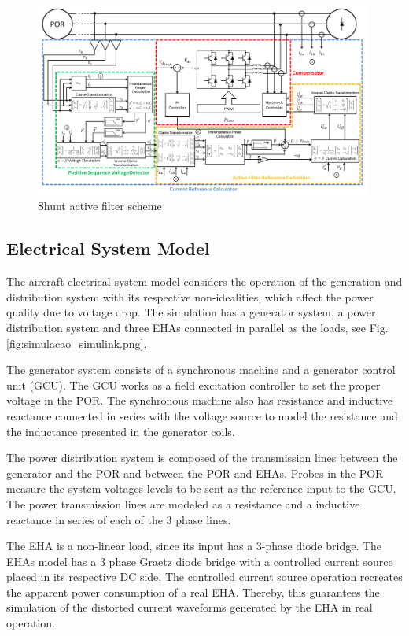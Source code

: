 \begin{figure}[!tb] %
	\centering
	\includegraphics[width=0.99\textwidth]{Figures/filtro_blocos_1.png}
	\caption{Shunt active filter scheme}
	\label{fig:filtro_blocos_1.png}
\end{figure}

\subsection{Electrical System Model}

The aircraft electrical system model considers the operation of the generation and distribution system with its respective non-idealities, which affect the power quality due to voltage drop. The simulation has a generator system, a power distribution system and three EHAs connected in parallel as the loads, see Fig. \ref{fig:simulacao_simulink.png}.

The generator system consists of a synchronous machine and a generator control unit (GCU). The GCU works as a field excitation controller to set the proper voltage in the POR. The synchronous machine also has resistance and inductive reactance connected in series with the voltage source to model the resistance and the inductance presented in the generator coils.

The power distribution system is composed of the transmission lines between the generator and the POR and between the POR and EHAs. Probes in the POR measure the system voltages levels to be sent as the reference input to the GCU. The power transmission lines are modeled as a resistance and a inductive reactance in series of each of the 3 phase lines.

The EHA is a non-linear load, since its input has a 3-phase diode bridge. The EHAs model has a 3 phase Graetz diode bridge with a controlled current source placed in its respective DC side. The controlled current source operation recreates the apparent power consumption of a real EHA. Thereby, this guarantees the simulation of the distorted current waveforms generated by the EHA in real operation.

